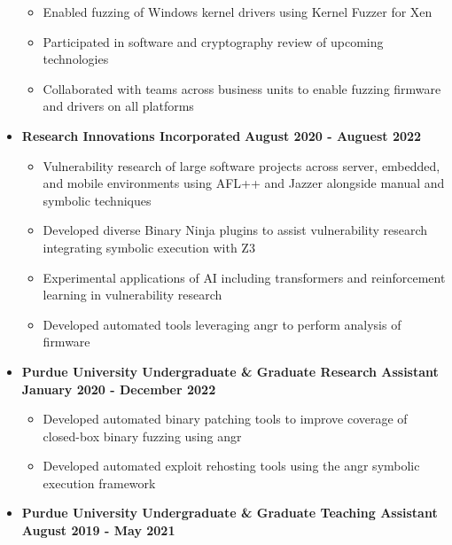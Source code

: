 \documentclass[letterpaper,10pt]{article}
\begin{document}
\begin{flushleft}
\begin{itemize}
\begin{itemize}
                \item Enabled fuzzing of Windows kernel drivers using Kernel Fuzzer for Xen \\
                \item Participated in software and cryptography review of upcoming technologies \\
                \item Collaborated with teams across business units to enable fuzzing firmware and drivers on all platforms \\
            \end{itemize}
        \item \textbf{Research Innovations Incorporated} \hfill \textbf{August 2020 - Auguest 2022} \\
            \begin{itemize}
                \item Vulnerability research of large software projects across server, embedded, and mobile environments using AFL++ and Jazzer alongside manual and symbolic techniques \\
                \item Developed diverse Binary Ninja plugins to assist vulnerability research integrating symbolic execution with Z3 \\
                \item Experimental applications of AI including transformers and reinforcement learning in vulnerability research \\
                \item Developed automated tools leveraging angr to perform analysis of firmware \\
            \end{itemize}
        \item \textbf{Purdue University Undergraduate \& Graduate Research Assistant} \hfill \textbf{January 2020 - December 2022} \\
            \begin{itemize}
                \item Developed automated binary patching tools to improve coverage of closed-box binary fuzzing using angr \\
                \item Developed automated exploit rehosting tools using the angr symbolic execution framework \\
            \end{itemize}
        \item \textbf{Purdue University Undergraduate \& Graduate Teaching Assistant} \hfill \textbf{August 2019 - May 2021} \\

\end{itemize}
\end{flushleft}
\end{document}
